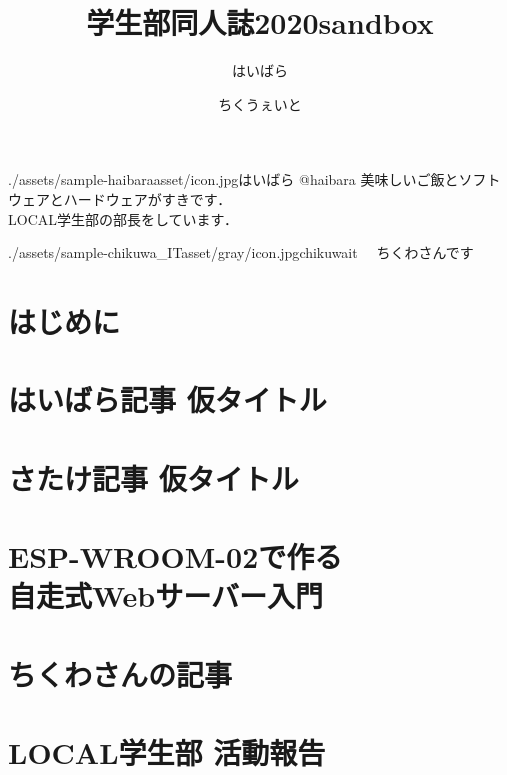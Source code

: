 \documentclass[autodetect-engine,dvipdfmx-if-dvi,ja=standard,b5paper,10.5pt,twoside,openany,layout=v2]{bxjsbook}
\title{学生部同人誌2020sandbox}
\author{はいばら \and ちくうぇいと }
\date{}
\newcommand{\articlepath}{./articles}
\newcommand{\assetspath}{./assets}
\newcommand{\chikuwaitasset}{\assetspath/sample-chikuwa_ITasset/gray}
\newcommand{\haibaraasset}{\assetspath/sample-haibaraasset}
\begin{document}
\frontmatter
\maketitle
\begin{myintroduce}{\haibaraasset/icon.jpg}{はいばら @haibara}
  美味しいご飯とソフトウェアとハードウェアがすきです．\\
  LOCAL学生部の部長をしています．
\end{myintroduce}
\begin{myintroduce}{\chikuwaitasset/icon.jpg}{chikuwait}
　ちくわさんです
\end{myintroduce}


\chapter{はじめに}
\addtolength{\oddsidemargin}{10pt}
\addtolength{\evensidemargin}{-10pt}


\tableofcontents
\mainmatter

\chapter{はいばら記事 仮タイトル}


\chapter{さたけ記事 仮タイトル}


\chapter{ESP-WROOM-02で作る \\自走式Webサーバー入門}


\chapter{ちくわさんの記事}


\chapter{LOCAL学生部 活動報告}

  
\newpage
\myimpression[%
name=LOCAL Students\\情報ボーイズの寄稿ノート 2.0, %
author=はいばら， \and %
ちくうぇいと, %
date=2020年5月3日, %
publisher=LOCAL学生部, %
print=有限会社ねこのしっぽ %
]%
\end{document}
